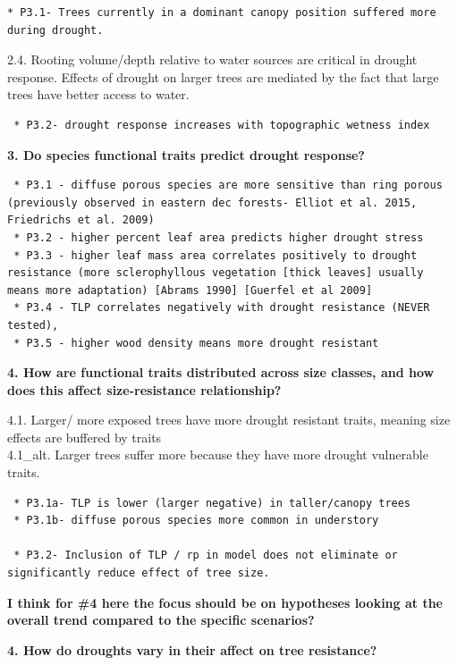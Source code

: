\documentclass[]{article}
\begin{document}
\begin{verbatim}
* P3.1- Trees currently in a dominant canopy position suffered more during drought. 
\end{verbatim}

2.4. Rooting volume/depth relative to water sources are critical in
drought response. Effects of drought on larger trees are mediated by the
fact that large trees have better access to water.

\begin{verbatim}
 * P3.2- drought response increases with topographic wetness index
\end{verbatim}

\textbf{3. Do species functional traits predict drought response?}

\begin{verbatim}
 * P3.1 - diffuse porous species are more sensitive than ring porous (previously observed in eastern dec forests- Elliot et al. 2015, Friedrichs et al. 2009)
 * P3.2 - higher percent leaf area predicts higher drought stress
 * P3.3 - higher leaf mass area correlates positively to drought resistance (more sclerophyllous vegetation [thick leaves] usually means more adaptation) [Abrams 1990] [Guerfel et al 2009]
 * P3.4 - TLP correlates negatively with drought resistance (NEVER tested),
 * P3.5 - higher wood density means more drought resistant
\end{verbatim}

\textbf{4. How are functional traits distributed across size classes,
and how does this affect size-resistance relationship?}

4.1. Larger/ more exposed trees have more drought resistant traits,
meaning size effects are buffered by traits\\
4.1\_alt. Larger trees suffer more because they have more drought
vulnerable traits.

\begin{verbatim}
 * P3.1a- TLP is lower (larger negative) in taller/canopy trees
 * P3.1b- diffuse porous species more common in understory 

 * P3.2- Inclusion of TLP / rp in model does not eliminate or significantly reduce effect of tree size.
\end{verbatim}

\textbf{I think for \#4 here the focus should be on hypotheses looking
at the overall trend compared to the specific scenarios?}

\textbf{4. How do droughts vary in their affect on tree resistance? }
\end{document}
